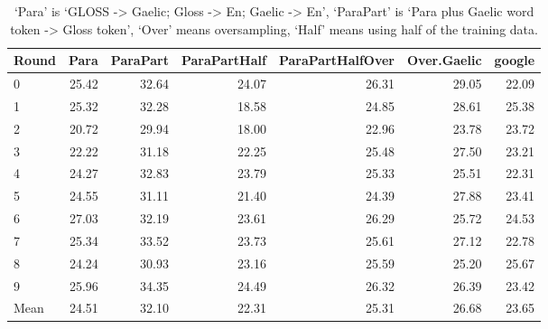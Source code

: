\documentclass[a4paper]{article}
\begin{document}
\begin{table}[ht]
\centering
\begin{tabular}{lrrrrrr}
  \hline
Round & Para & ParaPart & ParaPartHalf & ParaPartHalfOver & Over.Gaelic & google \\ 
  \hline
0 & 25.42 & 32.64 & 24.07 & 26.31 & 29.05 & 22.09 \\ 
  1 & 25.32 & 32.28 & 18.58 & 24.85 & 28.61 & 25.38 \\ 
  2 & 20.72 & 29.94 & 18.00 & 22.96 & 23.78 & 23.72 \\ 
  3 & 22.22 & 31.18 & 22.25 & 25.48 & 27.50 & 23.21 \\ 
  4 & 24.27 & 32.83 & 23.79 & 25.33 & 25.51 & 22.31 \\ 
  5 & 24.55 & 31.11 & 21.40 & 24.39 & 27.88 & 23.41 \\ 
  6 & 27.03 & 32.19 & 23.61 & 26.29 & 25.72 & 24.53 \\ 
  7 & 25.34 & 33.52 & 23.73 & 25.61 & 27.12 & 22.78 \\ 
  8 & 24.24 & 30.93 & 23.16 & 25.59 & 25.20 & 25.67 \\ 
  9 & 25.96 & 34.35 & 24.49 & 26.32 & 26.39 & 23.42 \\ 
   \hline
Mean & 24.51 & 32.10 & 22.31 & 25.31 & 26.68 & 23.65 \\ 
   \hline
\end{tabular}
\caption{`Para' is `GLOSS -> Gaelic; Gloss -> En; Gaelic -> En', `ParaPart' is `Para plus Gaelic word token -> Gloss token', `Over' means oversampling, `Half' means using half of the training data.} 
\label{Table:BLEUGlossGDALL}
\end{table}



\end{document}
